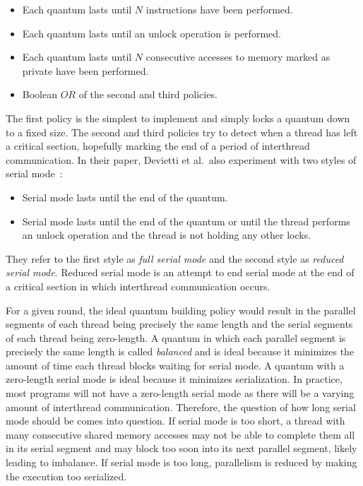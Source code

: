 \begin{itemize}
\item Each quantum lasts until $N$ instructions have been performed.

\item Each quantum lasts until an unlock operation is performed.

\item Each quantum lasts until $N$ consecutive accesses to memory
  marked as private have been performed.

\item Boolean $OR$ of the second and third policies.
\end{itemize}

The first policy is the simplest to implement and simply locks a
quantum down to a fixed size.  The second and third policies try to
detect when a thread has left a critical section, hopefully marking
the end of a period of interthread communication.  In their paper,
Devietti et al.\ also experiment with two styles of serial
mode~\cite{dmp}:

\begin{itemize}
\item Serial mode lasts until the end of the quantum.

\item Serial mode lasts until the end of the quantum or until the
  thread performs an unlock operation and the thread is not holding
  any other locks.
\end{itemize}

They refer to the first style as \emph{full serial mode} and the
second style as \emph{reduced serial mode}.  Reduced serial mode is an
attempt to end serial mode at the end of a critical section in which
interthread communication occurs.

For a given round, the ideal quantum building policy would result in
the parallel segments of each thread being precisely the same length
and the serial segments of each thread being zero-length.  A quantum
in which each parallel segment is precisely the same length is called
\emph{balanced} and is ideal because it minimizes the amount of time
each thread blocks waiting for serial mode.  A quantum with a
zero-length serial mode is ideal because it minimizes serialization.
In practice, most programs will not have a zero-length serial mode as
there will be a varying amount of interthread communication.
Therefore, the question of how long serial mode should be comes into
question.  If serial mode is too short, a thread with many consecutive
shared memory accesses may not be able to complete them all in its
serial segment and may block too soon into its next parallel segment,
likely leading to imbalance.  If serial mode is too long, parallelism
is reduced by making the execution too serialized.

